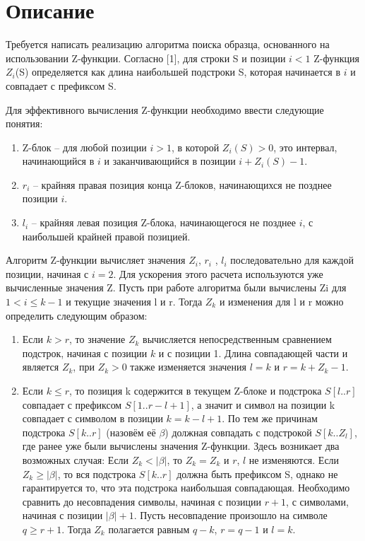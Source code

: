 \section{Описание}
Требуется написать реализацию алгоритма поиска образца, основанного на использовании Z-функции. 
Согласно [1], для строки S и позиции $i<1$ Z-функция $Z_i$(S) определяется как длина наибольшей подстроки S, которая начинается в $i$ и совпадает с префиксом S.

Для эффективного вычисления Z-функции необходимо ввести следующие понятия:
\begin{enumerate}
	\item Z-блок – для любой позиции $i > 1$, в которой $Z_i(S) > 0$, это интервал, начинающийся в $i$ и заканчивающийся в позиции $i + Z_i(S) - 1$.
	\item $r_i$ – крайняя правая позиция конца Z-блоков, начинающихся не позднее позиции $i$.
	\item $l_i$ – крайняя левая позиция Z-блока, начинающегося не позднее $i$, с наибольшей крайней правой позицией.
\end{enumerate}

Алгоритм Z-функции вычисляет значения $Z_i$, $r_i$ , $l_i$ последовательно для каждой позиции, начиная с $i = 2$. Для ускорения этого расчета используются уже вычисленные значения Z.
Пусть при работе алгоритма были вычислены Zi для $1 < i \leq k-1$ и текущие значения l и r. Тогда $Z_k$ и изменения для l и r можно определить следующим образом:
\begin{enumerate}
	\item Если $k > r$, то значение $Z_k$ вычисляется непосредственным сравнением подстрок, начиная с позиции $k$ и $с$ позиции 1. Длина совпадающей части и является $Z_k$, при $Z_k > 0$ также 
	изменяется значения $l = k$ и $r = k + Z_k - 1$.
	\item Если $k \leq r$, то позиция k содержится в текущем Z-блоке и подстрока $S[l..r]$
	совпадает с префиксом $S[1..r-l+ 1]$, а значит и символ на позиции k совпадает
	с символом в позиции $k = k - l + 1$. По тем же причинам подстрока $S[k..r]$
	(назовём её $\beta$) должная совпадать с подстрокой $S[k..Z_l]$, где ранее уже были
	вычислены значения Z-функции. Здесь возникает два возможных случая:
	Если $Z_k < | \beta |$, то $Z_k = Z_k$ и $r$, $l$ не изменяются.
	Если $Z_k \geq | \beta |$, то вся подстрока $S[k..r]$ должна быть префиксом S, однако не гарантируется то, что эта подстрока наибольшая совпадающая.
	Необходимо сравнить до несовпадения символы, начиная с позиции $r + 1$,
	с символами, начиная с позиции $| \beta |+ 1$. Пусть несовпадение произошло на
	символе $q \geq r + 1$. Тогда $Z_k$ полагается равным $q - k$, $r = q - 1$ и $l = k$.
\end{enumerate}	
\pagebreak

